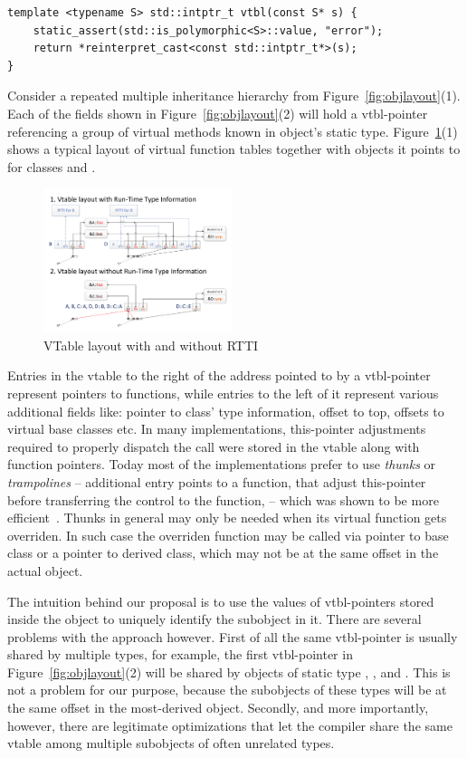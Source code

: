 \begin{lstlisting}
template <typename S> std::intptr_t vtbl(const S* s) {
    static_assert(std::is_polymorphic<S>::value, "error");
    return *reinterpret_cast<const std::intptr_t*>(s);
}
\end{lstlisting}

Consider a repeated multiple inheritance hierarchy from 
Figure~\ref{fig:objlayout}(1). Each of the  fields shown in 
Figure~\ref{fig:objlayout}(2) will hold a vtbl-pointer referencing a group of 
virtual methods known in object's static type. Figure~\ref{fig:vtbl}(1) shows a 
typical layout of virtual function tables together with objects it points to for 
classes  and .

\begin{figure}[htbp]
  \centering
    \includegraphics[width=0.49\textwidth]{v-table.pdf}
  \caption{VTable layout with and without RTTI}
  \label{fig:vtbl}
\end{figure}

Entries in the vtable to the right of the address pointed to by a vtbl-pointer 
represent pointers to functions, while entries to the left of it represent 
various additional fields like: pointer to class' type information, offset to 
top, offsets to virtual base classes etc. In many implementations, this-pointer 
adjustments required to properly dispatch the call were stored in the vtable 
along with function pointers. Today most of the implementations prefer to use 
\emph{thunks} or \emph{trampolines} -- additional entry points to a function, 
that adjust this-pointer before transferring the control to the function, -- 
which was shown to be more efficient~\cite{}. Thunks in general may only be 
needed when its virtual function gets overriden. In such case the overriden 
function may be called via pointer to base class or a pointer to derived class, 
which may not be at the same offset in the actual object.

The intuition behind our proposal is to use the values of vtbl-pointers stored 
inside the object to uniquely identify the subobject in it. There are several 
problems with the approach however. First of all the same vtbl-pointer is 
usually shared by multiple types, for example, the first vtbl-pointer in 
Figure~\ref{fig:objlayout}(2) will be shared by objects of static type 
, ,  and . This is not a problem for our 
purpose, because the subobjects of these types will be at the same offset in the 
most-derived object. Secondly, and more importantly, however, there are legitimate 
optimizations that let the compiler share the same vtable among multiple 
subobjects of often unrelated types.

